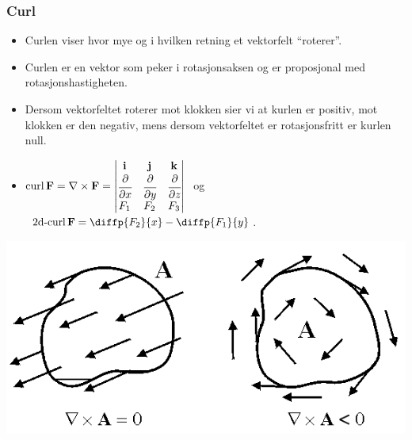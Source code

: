 \begin{frame}
  \frametitle{Curl}
  \begin{itemize}
  \item Curlen viser hvor mye og i hvilken retning et
      vektorfelt “roterer”.
      \item Curlen er en vektor som peker i rotasjonsaksen og er proposjonal med rotasjonshastigheten.
    \item Dersom vektorfeltet roterer mot klokken sier vi at kurlen er positiv,
mot klokken er den negativ, mens dersom vektorfeltet er rotasjonsfritt er kurlen
      null.
    \item $\operatorname{curl} \mathbf{F} = \nabla \times \mathbf{F} =
      \begin{vmatrix} \mathbf{i} & \mathbf{j} & \mathbf{k} \\ \cfrac{\partial}{\partial x} &
        \cfrac{\partial}{\partial y} & \cfrac{\partial}{\partial z}\\ F_1 & F_2  & F_3
      \end{vmatrix} \ $ og $ \ \2d-curl \F = \diffp{{F_2}}{x} - \diffp{{F_1}}{y} $.
  \end{itemize}
  \begin{center}
      \includegraphics[scale=0.5]{../img/curl-negative.png}
\end{center}
\end{frame}

